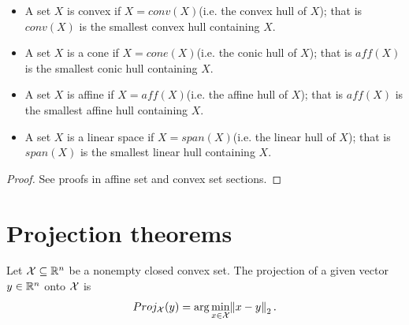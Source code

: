 \begin{refsection}
\begin{lemma}\hfill
	\begin{itemize}
		\item A set $X$ is convex  if $X = conv(X)$(i.e. the convex hull of $X$); that is $conv(X)$ is the smallest convex hull containing $X$.
		\item A set $X$ is a cone if $X = cone(X)$(i.e. the conic hull of $X$); that is $aff(X)$ is the smallest conic hull containing $X$.
		\item A set $X$ is affine if $X = aff(X)$(i.e. the affine hull of $X$); that is $aff(X)$ is the smallest affine hull containing $X$.
		\item A set $X$ is a linear space if $X = span(X)$(i.e. the linear hull of $X$); that is $span(X)$ is the smallest linear hull containing $X$.
	\end{itemize}
\end{lemma}
\begin{proof}
See proofs in affine set and convex set sections.
\end{proof}

\section{Projection theorems}
\begin{definition}
Let $\mathcal{X} \subseteq \mathbb{R}^n$ be a nonempty closed convex set. The projection of a given vector $y\in \mathbb{R}^n$ onto $\mathcal{X}$ is
$$Proj_{\mathcal{X}}(y) = \arg\min_{x\in\mathcal{X}} \norm{x-y}_2.$$ 
\end{definition}




\end{refsection}

